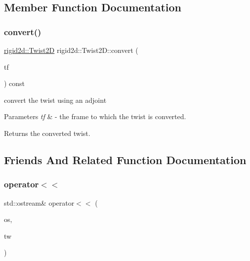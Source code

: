 \subsection{Member Function Documentation}
\mbox{\label{classrigid2d_1_1Twist2D_af5d38e8a9b62c7f414453ea37e012697}} 
\subsubsection{\texorpdfstring{convert()}{convert()}}
{\footnotesize\ttfamily \hyperlink{classrigid2d_1_1Twist2D}{rigid2d\+::\+Twist2D} rigid2d\+::\+Twist2\+D\+::convert (\begin{DoxyParamCaption}\item[{const \hyperlink{classrigid2d_1_1Transform2D}{Transform2D} \&}]{tf }\end{DoxyParamCaption}) const}



convert the twist using an adjoint 


\begin{DoxyParams}{Parameters}
{\em tf} & -\/ the frame to which the twist is converted. \\
\hline
\end{DoxyParams}
\begin{DoxyReturn}{Returns}
the converted twist. 
\end{DoxyReturn}


\subsection{Friends And Related Function Documentation}
\mbox{\label{classrigid2d_1_1Twist2D_aa73bc548f9e2f87b66c08cd96443e792}} 
\subsubsection{\texorpdfstring{operator$<$$<$}{operator<<}}
{\footnotesize\ttfamily std\+::ostream\& operator$<$$<$ (\begin{DoxyParamCaption}\item[{std\+::ostream \&}]{os,  }\item[{const \hyperlink{classrigid2d_1_1Twist2D}{Twist2D} \&}]{tw }\end{DoxyParamCaption})\hspace{0.3cm}{\ttfamily [friend]}}




